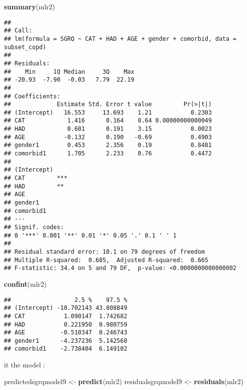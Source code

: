 \documentclass[
]{article}
\newenvironment{Shaded}{\begin{snugshade}}{\end{snugshade}}
\newcommand{\FunctionTok}[1]{\textcolor[rgb]{0.13,0.29,0.53}{\textbf{#1}}}
\newcommand{\NormalTok}[1]{#1}
\newcommand{\OtherTok}[1]{\textcolor[rgb]{0.56,0.35,0.01}{#1}}
\begin{document}
\begin{Shaded}
\begin{Highlighting}[]
\FunctionTok{summary}\NormalTok{(mlr2)}
\end{Highlighting}
\end{Shaded}

\begin{verbatim}
## 
## Call:
## lm(formula = SGRQ ~ CAT + HAD + AGE + gender + comorbid, data = subset_copd)
## 
## Residuals:
##    Min     1Q Median     3Q    Max 
## -20.93  -7.90  -0.03   7.79  22.19 
## 
## Coefficients:
##             Estimate Std. Error t value         Pr(>|t|)
## (Intercept)   16.553     13.693    1.21           0.2303
## CAT            1.416      0.164    8.64 0.00000000000049
## HAD            0.601      0.191    3.15           0.0023
## AGE           -0.132      0.190   -0.69           0.4903
## gender1        0.453      2.356    0.19           0.8481
## comorbid1      1.705      2.233    0.76           0.4472
##                
## (Intercept)    
## CAT         ***
## HAD         ** 
## AGE            
## gender1        
## comorbid1      
## ---
## Signif. codes:  
## 0 '***' 0.001 '**' 0.01 '*' 0.05 '.' 0.1 ' ' 1
## 
## Residual standard error: 10.1 on 79 degrees of freedom
## Multiple R-squared:  0.685,  Adjusted R-squared:  0.665 
## F-statistic: 34.4 on 5 and 79 DF,  p-value: <0.0000000000000002
\end{verbatim}

\begin{Shaded}
\begin{Highlighting}[]
\FunctionTok{confint}\NormalTok{(mlr2)}
\end{Highlighting}
\end{Shaded}

\begin{verbatim}
##                  2.5 %    97.5 %
## (Intercept) -10.702143 43.808849
## CAT           1.090147  1.742682
## HAD           0.221950  0.980759
## AGE          -0.510347  0.246743
## gender1      -4.237236  5.142568
## comorbid1    -2.738404  6.149102
\end{verbatim}

it the model :

\begin{Shaded}
\begin{Highlighting}[]
\NormalTok{predictedsgrqmodel9 }\OtherTok{\textless{}{-}} \FunctionTok{predict}\NormalTok{(mlr2)}
\NormalTok{residualsgrqmodel9 }\OtherTok{\textless{}{-}} \FunctionTok{residuals}\NormalTok{(mlr2)}
\end{Highlighting}
\end{Shaded}
\end{document}
